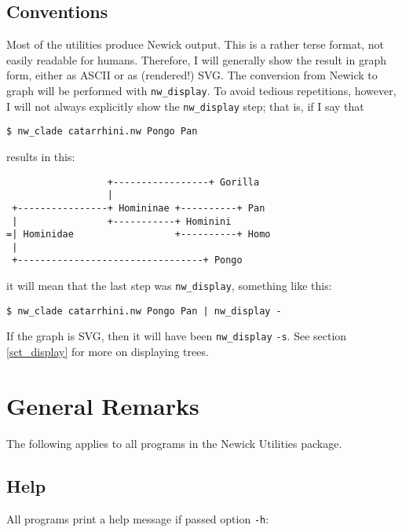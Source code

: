 \documentclass[a4paper,10pt]{report}
\newcommand{\nutils}{Newick Utilities}
\newcommand{\ascii}{\textsc{ASCII}}
\newcommand{\svg}{\textsc{SVG}}
\newcommand{\display}{\texttt{nw\_display}}
\begin{document}
\section{Conventions}

Most of the utilities produce Newick output. This is a rather terse format, not easily readable for humans. Therefore, I will generally show the result in graph form, either as \ascii{} or as (rendered!) \svg. The conversion from Newick to graph will be performed with \display{}. To avoid tedious repetitions, however, I will not always explicitly show the \display{} step; that is, if I say that 
\begin{verbatim}
$ nw_clade catarrhini.nw Pongo Pan
\end{verbatim} 
results in this:
\begin{samepage}
\begin{verbatim}
                  +-----------------+ Gorilla     
                  |                               
 +----------------+ Homininae +----------+ Pan    
 |                +-----------+ Hominini          
=| Hominidae                  +----------+ Homo   
 |                                                
 +---------------------------------+ Pongo  
\end{verbatim} 
\end{samepage}
it will mean that the last step was \display{}, something like this:
\begin{verbatim}
$ nw_clade catarrhini.nw Pongo Pan | nw_display -
\end{verbatim}
If the graph is \svg, then it will have been \display{} \verb+-s+. See section \ref{sct_display} for more on displaying trees.

\chapter{General Remarks}
\label{chap_general}

The following applies to all programs in the \nutils{} package.

\section{Help}
\label{sect_help}

All programs print a help message if passed option \texttt{-h}:
\end{document}
